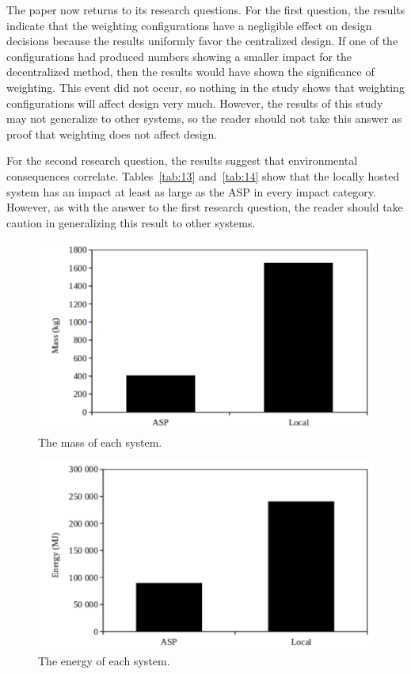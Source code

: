 \documentclass[final,journal,10pt,letterpaper,oneside,twocolumn,compsoc]%
{IEEEtran}
\begin{document}
The paper now returns to its research questions. For the first question, the
results indicate that the weighting
configurations have a negligible effect on design decisions because the results
uniformly favor the centralized design. If one of the configurations had
produced
numbers showing a smaller impact for the decentralized method, then the results
would have shown the significance of weighting. This event did not occur, so
nothing in the study shows that weighting configurations will affect design very
much. However, the results of this study may not generalize to other systems, so
the reader should not take this answer as proof that weighting does not affect
design.

For the second research question, the results suggest that environmental
consequences
correlate. Tables~\ref{tab:13} and~\ref{tab:14} show that the locally hosted
system has
an impact at least as large as the ASP in every impact category. However, as
with the answer to the first research question, the
reader should take caution in generalizing this result to other systems.

\begin{figure}[htbp]
  \centering
    \includegraphics[scale=0.55]{mass}
  \caption{The mass of each system.}
  \label{fig:tab3}
\end{figure}
\begin{figure}[htbp]
  \centering
    \includegraphics[scale=0.55]{energy}
  \caption{The energy of each system.}
  \label{fig:tab4}
\end{figure}
\end{document}
